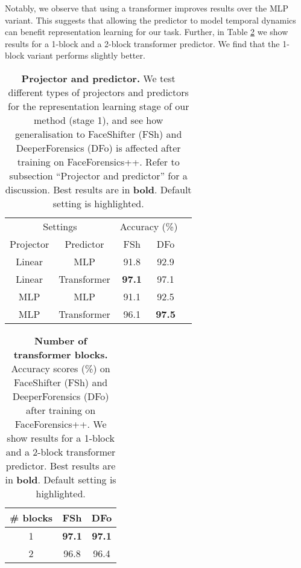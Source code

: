 \documentclass[10pt,twocolumn,letterpaper]{article}
\begin{document}
\begin{description}[wide,itemindent=\labelsep]
Notably, we observe that using a transformer improves results over the MLP variant. This suggests that allowing the predictor to model temporal dynamics can benefit representation learning for our task. Further, in Table \ref{table:transformer_layers} we show results for a 1-block and a 2-block transformer predictor. We find that the 1-block variant performs slightly better.

\begin{table}
\begin{center}
\begin{tabular}{c c c c c}\toprule
\multicolumn{2}{c}{Settings} & \multicolumn{2}{c}{Accuracy (\%)} \\ \cmidrule(lr){1-2} \cmidrule(lr){3-4}
Projector & Predictor & FSh & DFo  \\ \midrule
Linear & MLP & 91.8 & 92.9 \\
\rowcolor{light-gray}
Linear & Transformer & \textbf{97.1} & 97.1 \\
MLP & MLP & 91.1 & 92.5 \\
MLP & Transformer & 96.1 & \textbf{97.5} \\ \bottomrule 
\end{tabular}
\end{center}
\caption{\textbf{Projector and predictor.} We test different types of projectors and predictors for the representation learning stage of our method (stage 1), and see how generalisation to FaceShifter (FSh) and DeeperForensics (DFo) is affected after training on FaceForensics++. Refer to subsection ``Projector and predictor'' for a discussion. Best results are in \textbf{bold}. Default setting is \colorbox{light-gray}{highlighted}.}
\label{table:projector_and_predictor}
\end{table}

\begin{table}
\begin{center}
\begin{tabular}{c c c}\toprule
\# blocks & FSh & DFo \\ \midrule
\rowcolor{light-gray}
1 & \textbf{97.1} & \textbf{97.1} \\
2 & 96.8 & 96.4 \\ \bottomrule
\end{tabular}
\end{center}
\caption{\textbf{Number of transformer blocks.} Accuracy scores (\%) on FaceShifter (FSh) and DeeperForensics (DFo) after training on FaceForensics++. We show results for a 1-block and a 2-block transformer predictor. Best results are in \textbf{bold}. Default setting is \colorbox{light-gray}{highlighted}.}
\label{table:transformer_layers}
\end{table}


\end{description}
\end{document}
